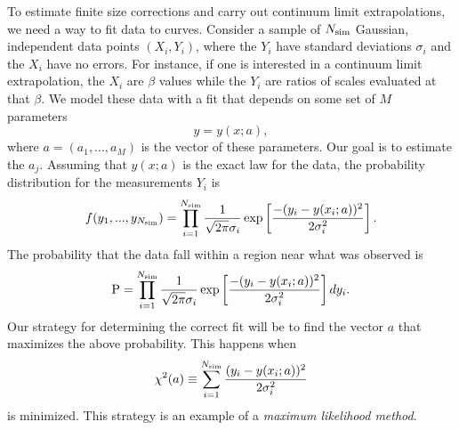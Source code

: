 To estimate finite size corrections and carry out continuum limit
extrapolations, we need a way to fit data to curves.
Consider a sample of $N_{\text{sim}}$ Gaussian, independent data points $(X_i,Y_i)$,
where the $Y_i$ have standard deviations $\sigma_i$ and the $X_i$ have
no errors. For instance, if one is interested in a continuum limit
extrapolation, the $X_i$ are $\beta$ values while the $Y_i$ are
ratios of scales evaluated at that $\beta$.
We model these data with a fit that depends on some set
of $M$ parameters
\begin{equation}
  y=y(x;a),
\end{equation}
where $a=(a_1,...,a_M)$ is the vector of these parameters. Our goal
is to estimate the $a_j$.
Assuming that $y(x;a)$ is the exact law for the data, the probability
distribution for the measurements $Y_i$ is 
\begin{equation}
  f(y_1,...,y_{N_{\text{sim}}})=\prod_{i=1}^{N_{\text{sim}}}\frac{1}{\sqrt{2\pi}\sigma_i}
      \exp\left[\frac{-(y_i-y(x_i;a))^2}{2\sigma_i^2}\right].
\end{equation}
The probability that the data fall within a region near what was observed is
\begin{equation}
  \text{P}=\prod_{i=1}^{N_{\text{sim}}}\frac{1}{\sqrt{2\pi}\sigma_i}
      \exp\left[\frac{-(y_i-y(x_i;a))^2}{2\sigma_i^2}\right]dy_i.
\end{equation}
Our strategy for determining the correct fit will be to find the vector $a$
that maximizes the above probability. This happens when
\begin{equation}
  \chi^2(a)\equiv\sum_{i=1}^{N_{\text{sim}}}\frac{(y_i-y(x_i;a))^2}{2\sigma_i^2}
\end{equation}
is minimized. This strategy is an example of a {\it maximum likelihood method}.

